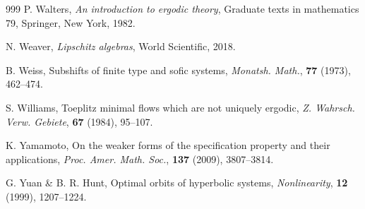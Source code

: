 \documentclass[reqno,11pt]{amsart}
\theoremstyle{definition}
\theoremstyle{remark}
\theoremstyle{remark}
\numberwithin{equation}{section}
\begin{document}
\begin{thebibliography}{999}
P. Walters,
\textit{An introduction to ergodic theory},
Graduate texts in mathematics 79,
Springer, New York, 1982.


 N. Weaver, {\it Lipschitz algebras}, World Scientific, 2018.

    B. Weiss, Subshifts of finite type and sofic systems, {\it Monatsh. Math.}, {\bf 77} (1973), 462--474.

	
 S. Williams, 
Toeplitz minimal flows which are not uniquely ergodic,
{\it Z. Wahrsch. Verw. Gebiete}, {\bf 67} (1984), 95--107.

  K. Yamamoto, 
On the weaker forms of the specification property and their applications,
{\it Proc. Amer. Math. Soc.}, {\bf 137} (2009), 3807--3814.
	
	 G. Yuan \& B. R. Hunt,	Optimal orbits of hyperbolic systems, {\it Nonlinearity}, {\bf 12} (1999), 1207--1224.


	
\end{thebibliography}
\end{document}
